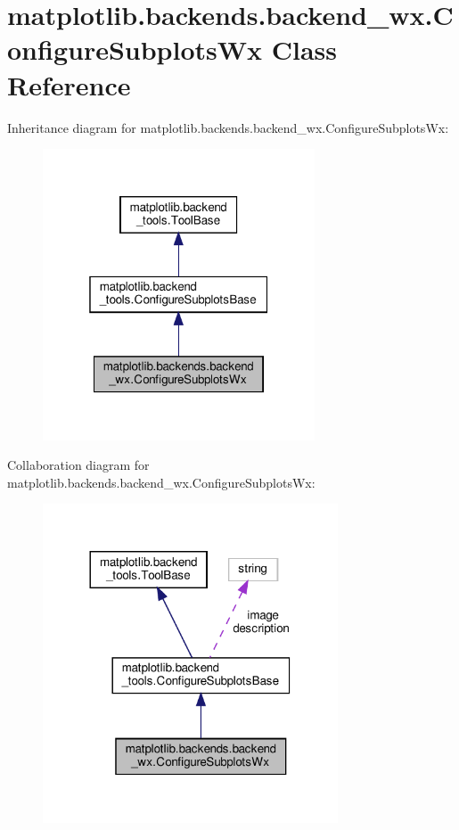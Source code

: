 \hypertarget{classmatplotlib_1_1backends_1_1backend__wx_1_1ConfigureSubplotsWx}{}\section{matplotlib.\+backends.\+backend\+\_\+wx.\+Configure\+Subplots\+Wx Class Reference}
\label{classmatplotlib_1_1backends_1_1backend__wx_1_1ConfigureSubplotsWx}


Inheritance diagram for matplotlib.\+backends.\+backend\+\_\+wx.\+Configure\+Subplots\+Wx\+:
\nopagebreak
\begin{figure}[H]
\begin{center}
\leavevmode
\includegraphics[width=229pt]{classmatplotlib_1_1backends_1_1backend__wx_1_1ConfigureSubplotsWx__inherit__graph}
\end{center}
\end{figure}


Collaboration diagram for matplotlib.\+backends.\+backend\+\_\+wx.\+Configure\+Subplots\+Wx\+:
\nopagebreak
\begin{figure}[H]
\begin{center}
\leavevmode
\includegraphics[width=248pt]{classmatplotlib_1_1backends_1_1backend__wx_1_1ConfigureSubplotsWx__coll__graph}
\end{center}
\end{figure}

